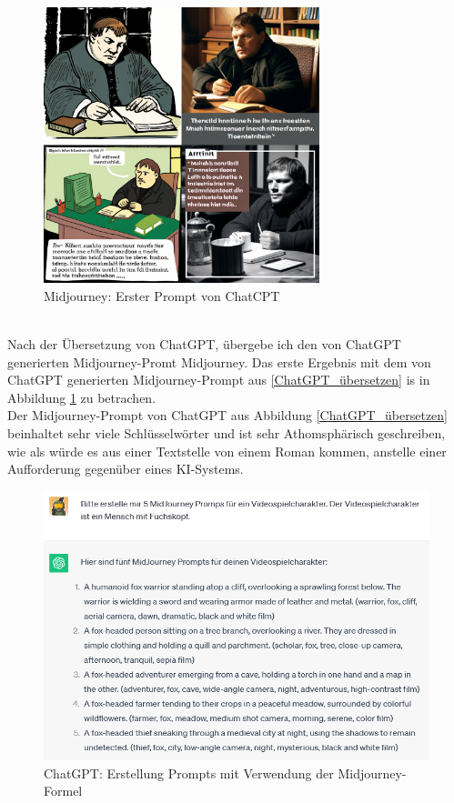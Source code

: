 \begin{figure}[h]
	\centering
	\includegraphics[width=8.022cm]{BilderFuerBA/MLaufEnglisch.png}
	\caption{Midjourney: Erster Prompt von ChatCPT}
	\label{Midjourney_erster_Prompt}
\end{figure}
\\
Nach der Übersetzung von ChatGPT, übergebe ich den von ChatGPT generierten Midjourney-Promt Midjourney. Das erste Ergebnis mit dem von ChatGPT generierten Midjourney-Prompt aus \ref{ChatGPT_übersetzen} is in Abbildung \ref{Midjourney_erster_Prompt} zu betrachen.
\\
Der Midjourney-Prompt von ChatGPT aus Abbildung \ref{ChatGPT_übersetzen} beinhaltet sehr viele Schlüsselwörter und ist sehr Athomsphärisch geschreiben, wie als würde es aus einer Textstelle von einem Roman kommen, anstelle einer Aufforderung gegenüber eines KI-Systems.
\begin{figure}[h]
	\centering
	\includegraphics[width=14cm]{BilderFuerBA/05.png}
	\caption{ChatGPT: Erstellung Prompts mit Verwendung der Midjourney-Formel}
	\label{chatgpt_mj-formel_mit_Klammern}
\end{figure}
